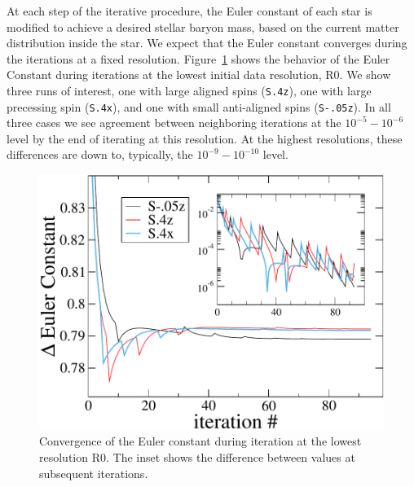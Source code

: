 \documentclass[aps,prd,amsmath,floatfix
,twocolumn
,superscriptaddress,nofootinbib,showpacs]{revtex4-1}
\theoremstyle{plain} \newtheorem{thm}{Theorem} \newtheorem{lem}{Lemma}
\newcommand{\red}[1]{\textcolor{Red}{#1}}
\begin{document}
At each step of the iterative procedure, the Euler constant of each
star is modified to achieve a desired stellar baryon mass, based on
the current matter distribution inside the star.  We expect that the Euler constant converges during the iterations at a fixed resolution. Figure~\ref{fig:EulerConstConvergence}  shows the behavior of the Euler Constant during iterations at the lowest initial data resolution, R0.  
We show three runs of interest, one
with large aligned spins ({\tt S.4z}), one with large precessing spin ({\tt S.4x}), and one with small anti-aligned spins ({\tt S-.05z}). 
In all three cases we see agreement between neighboring iterations at the
$10^{-5}-10^{-6}$ level by the end of iterating at this resolution. At the highest resolutions, these
differences are down to, typically, the $10^{-9}-10^{-10}$ level.

\begin{figure}
\includegraphics[width=0.95\columnwidth]{EulerConstConvergence}
\caption{\label{fig:EulerConstConvergence}
Convergence of the Euler
  constant during iteration at the lowest resolution R0. The inset shows the difference
  between values at subsequent iterations.}
\end{figure}
\end{document}

